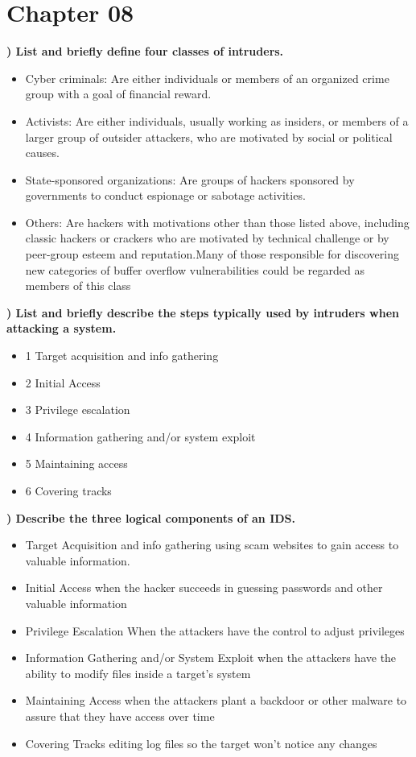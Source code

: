 \documentclass{report}
\title{\classinfo}
\author{\semester}
\date{\today}
\newcommand{\mysection}[1]{\section*{#1}}
\newcommand{\mysubsection}[2]{\textbf{\romannumeral #1) #2}}
\begin{document}
\maketitle

\mysection{\textbf{Chapter 08}}

\mysubsection{1}{List and briefly define four classes of intruders.}

\begin{itemize}
  \item{Cyber criminals:}  Are either individuals or members of an organized crime group with a 
    goal of financial reward.
  \item{ Activists:} Are either individuals, usually working as insiders, or members of a larger 
    group of outsider attackers, who are motivated by social or political causes.
  \item{ State-sponsored organizations:} Are groups of hackers sponsored by governments to conduct 
    espionage or sabotage activities.
  \item{Others:} Are hackers with motivations other than those listed above, including classic 
    hackers or crackers who are motivated by technical challenge or by peer-group esteem and 
    reputation.Many of those responsible for discovering new categories of buffer overflow 
    vulnerabilities could be regarded as members of this class
\end{itemize}


\noindent\mysubsection{2}{List and briefly describe the steps typically used by intruders when attacking a system.}
\begin{itemize}
  \item{1} Target acquisition and info gathering
  \item{2} Initial Access
  \item{3} Privilege escalation
  \item{4} Information gathering and/or system exploit
  \item{5} Maintaining access
  \item{6} Covering tracks
\end{itemize}

\noindent\mysubsection{3}{Describe the three logical components of an IDS.}
\begin{itemize}
  \item{Target Acquisition and info gathering} using scam websites to gain
    access to valuable information.
  \item{Initial Access} when the hacker succeeds in guessing passwords
    and other valuable information
  \item{Privilege Escalation} When the attackers have the control
    to adjust privileges
  \item{Information Gathering and/or System Exploit} when the attackers
    have the ability to modify files inside a target's system
  \item{Maintaining Access} when the attackers plant a backdoor or other
    malware to assure that they have access over time
  \item{Covering Tracks} editing log files so the target won't notice any
    changes
\end{itemize}
\end{document}
